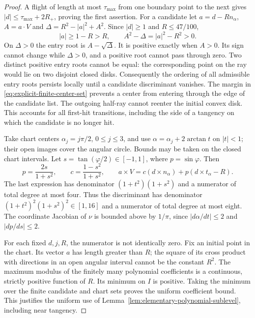 \begin{proof}
A flight of length at most $\tau_{\max}$ from one boundary point to the
next gives $|d|\le\tau_{\max}+2R_+$, proving the first assertion.
For a candidate let $a=d-Rn_\alpha$, $A=a\cdot V$ and
$\Delta=R^2-|a|^2+A^2$. Since $|d|\ge1$ and $R\le47/100$,
\[
 |a|\ge1-R>R,\qquad A^2-\Delta=|a|^2-R^2>0.
\]
On $\Delta>0$ the entry root is $A-\sqrt\Delta$. It is positive
exactly when $A>0$. Its sign cannot change while $\Delta>0$, and a
positive root cannot pass through zero. Two distinct positive entry
roots cannot be equal: the corresponding point on the ray would lie
on two disjoint closed disks. Consequently the ordering of all admissible
entry roots persists locally until a candidate discriminant vanishes.
The margin in \eqref{eq:explicit-finite-center-set} prevents a center
from entering through the edge of the candidate list. The outgoing
half-ray cannot reenter the initial convex disk. This accounts for all
first-hit transitions, including the side of a tangency on which the
candidate is no longer hit.

Take chart centers $\alpha_j=j\pi/2$, $0\le j\le3$, and use
$\alpha=\alpha_j+2\arctan t$ on $|t|<1$; their open images cover the
angular circle. Bounds may be taken on the closed chart intervals.
Let $s=\tan(\varphi/2)\in[-1,1]$, where $p=\sin\varphi$.
Then
\[
 p=\frac{2s}{1+s^2},\qquad c=\frac{1-s^2}{1+s^2},\qquad
 a\mathbin{\times}V
  =c(d\mathbin{\times}n_\alpha)
                  +p(d\mathbin{\times}t_\alpha-R).
\]
The last expression has denominator $(1+t^2)(1+s^2)$ and a
numerator of total degree at most four. Thus the discriminant has
denominator $(1+t^2)^2(1+s^2)^2\in[1,16]$ and a numerator of total
degree at most eight. The coordinate Jacobian of $\nu$ is bounded
above by $1/\pi$, since $|d\alpha/dt|\le2$ and $|dp/ds|\le2$.

For each fixed $d,j,R$, the numerator is not identically zero. Fix an
initial point in the chart. Its vector $a$ has length greater than $R$;
the square of its cross product with directions in an open angular
interval cannot be the constant $R^2$. The maximum modulus of the
finitely many polynomial coefficients is a continuous, strictly positive
function of $R$. Its minimum on $I$ is positive. Taking the minimum
over the finite candidate and chart sets proves the uniform coefficient
bound. This justifies the uniform use of
Lemma~\ref{lem:elementary-polynomial-sublevel}, including near tangency.
\end{proof}

